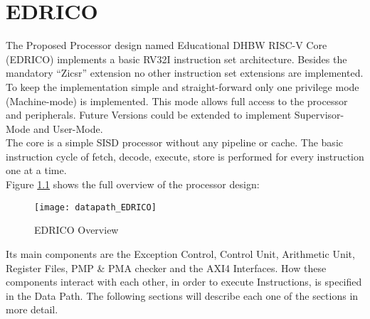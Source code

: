 
\chapter{EDRICO}
\label{chapter:edrico}
The Proposed Processor design named Educational DHBW RISC-V Core (EDRICO) implements a basic RV32I
instruction set architecture. Besides the mandatory “Zicsr” extension no other
instruction set extensions are implemented. To keep the implementation simple and
straight-forward only one privilege mode (Machine-mode) is implemented. This mode
allows full access to the processor and peripherals. Future Versions could be
extended to implement Supervisor-Mode and User-Mode.\\
The core is a simple \acf{SISD} processor without any pipeline or cache. The basic instruction cycle of fetch, decode, execute, store is performed for every instruction one at a time.\\
Figure \ref{fig:edricooverview} shows the full overview of the processor design:

\begin{figure}[H]
	\centering
	\texttt{[image: datapath\_EDRICO]}
	\caption{EDRICO Overview}
	\label{fig:edricooverview}
\end{figure}

Its main components are the Exception Control, Control Unit, Arithmetic Unit,
Register Files, PMP \& PMA checker and the AXI4 Interfaces. How these components interact with each other, in order to execute Instructions, is specified in the Data Path.
The following sections will describe each one of the sections in more detail.

